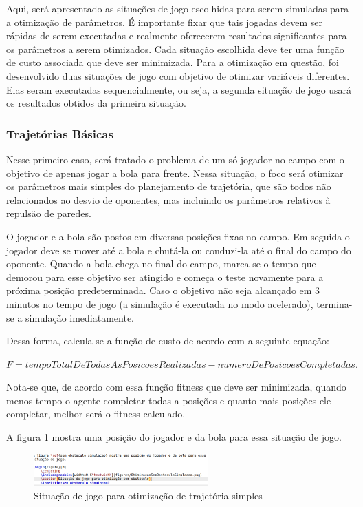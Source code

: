 \documentclass[a4paper,12pt]{article}
\begin{document}
Aqui, será apresentado as situações de jogo escolhidas para serem simuladas para a otimização de parâmetros. É importante fixar que tais jogadas devem ser rápidas de serem executadas e realmente oferecerem resultados significantes para os parâmetros a serem otimizados. Cada situação escolhida deve ter uma função de custo associada que deve ser minimizada.
Para a otimização em questão, foi desenvolvido duas situações de jogo com objetivo de otimizar variáveis diferentes. Elas seram executadas sequencialmente, ou seja, a segunda situação de jogo usará os resultados obtidos da primeira situação.

\subsubsection{Trajetórias Básicas}

Nesse primeiro caso, será tratado o problema de um só jogador no campo com o objetivo de apenas jogar a bola para frente. Nessa situação, o foco será otimizar os parâmetros mais simples do planejamento de trajetória, que são todos não relacionados ao desvio de oponentes, mas incluindo os parâmetros relativos à repulsão de paredes.

O jogador e a bola são postos em diversas posições fixas no campo. Em seguida o jogador deve se mover até a bola e chutá-la ou conduzi-la até o final do campo do oponente. Quando a bola chega no final do campo, marca-se o tempo que demorou para esse objetivo ser atingido e começa o teste novamente para a próxima posição predeterminada. Caso o objetivo não seja alcançado em 3 minutos no tempo de jogo (a simulação é executada no modo acelerado), termina-se a simulação imediatamente.

Dessa forma, calcula-se a função de custo de acordo com a seguinte equação:

$ F = tempoTotalDeTodasAsPosicoesRealizadas - numeroDePosicoesCompletadas. $
 
Nota-se que, de acordo com essa função fitness que deve ser minimizada, quando menos tempo o agente completar todas a posições e quanto mais posições ele completar, melhor será o fitness calculado.

A figura \ref{fig:sem_obstaculo_simulacao} mostra uma posição do jogador e da bola para essa situação de jogo.

\begin{figure}[H]
	\centering
	\includegraphics[width=0.6\textwidth]{figures/OtimizacaoSemObstaculoSimulacao.png}
	\caption{Situação de jogo para otimização de trajetória simples}
	\label{fig:sem_obstaculo_simulacao}
\end{figure}
\end{document}
